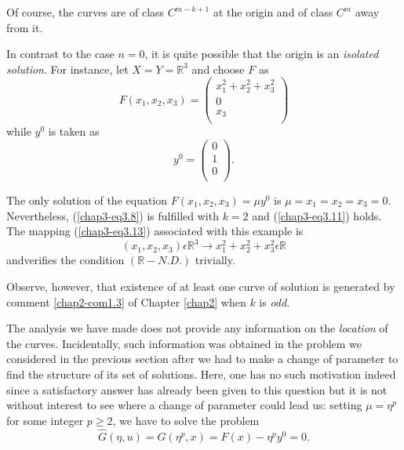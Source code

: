 Of course, the curves are of class $C^{m-k+1}$ at the origin and of
class $C^{m}$ away from it.

\begin{remark}\label{chap3-rem3.1}
In contrast to the case $n = 0$, it is quite possible that the origin
is an {\em isolated solution}. For instance, let $X = Y =
\mathbb{R}^{3}$ and choose $F$ as
\begin{equation*}
F(x_{1}, x_{2}, x_{3}) =
\begin{pmatrix}
x_{1}^{2} + x_{2}^{2} + x_{3}^{2}\\
0  \\
 x_{3}  \\
\end{pmatrix}
\end{equation*}
while $y^{0}$ is taken as
\begin{equation*}
y^{0} = 
\begin{pmatrix}
0\\
1\\
0\\
\end{pmatrix}
.
\end{equation*}

The only solution of the equation $F(x_{1}, x_{2}, x_{3}) = \mu y^{0}$
is $\mu = x_{1} = x_{2} = x_{3} = 0$. Nevertheless,
(\ref{chap3-eq3.8}) is fulfilled with $k = 2$ and (\ref{chap3-eq3.11})
holds. The mapping (\ref{chap3-eq3.13}) associated with this example
is
$$
(x_{1}, x_{2}, x_{3}) \epsilon \mathbb{R}^{3} \to x_{1}^{2} +
x_{2}^{2} + x_{3}^{2} \epsilon \mathbb{R}
$$
and\pageoriginale verifies the condition $(\mathbb{R}-N.D.)$ trivially.
\end{remark}

Observe, however, that existence of at least one curve of solution is
generated by comment \ref{chap2-com1.3} of Chapter \ref{chap2} when $k$
is {\em odd}.

The analysis we have made does not provide any information on the {\em
location} of the curves. Incidentally, such information was obtained
in the problem we considered in the previous section after we had to
make a change of parameter to find the structure of its set of
solutions. Here, one has no such motivation indeed since a
satisfactory answer has already been given to this question but it is
not without interest to see where a change of parameter could lead us:
setting $\mu = \eta^{p}$ for some integer $p \geq 2$, we have to solve
the problem
\begin{equation*}
\hat{G}(\eta, u) = G(\eta^{p}, x) = F(x) - \eta^{p}y^{0} = 0.\tag{3.14}\label{chap3-eq3.14}
\end{equation*}

